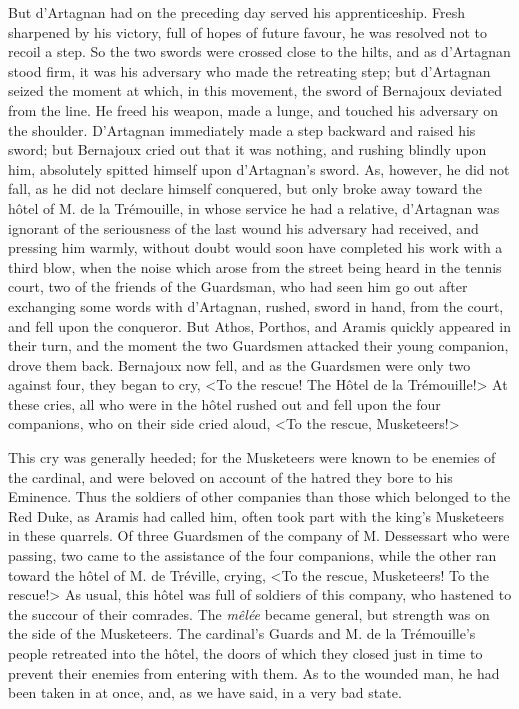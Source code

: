 But d'Artagnan had on the preceding day served his apprenticeship. Fresh sharpened by his victory, full of hopes of future favour, he was resolved not to recoil a step. So the two swords were crossed close to the hilts, and as d'Artagnan stood firm, it was his adversary who made the retreating step; but d'Artagnan seized the moment at which, in this movement, the sword of Bernajoux deviated from the line. He freed his weapon, made a lunge, and touched his adversary on the shoulder. D'Artagnan immediately made a step backward and raised his sword; but Bernajoux cried out that it was nothing, and rushing blindly upon him, absolutely spitted himself upon d'Artagnan's sword. As, however, he did not fall, as he did not declare himself conquered, but only broke away toward the hôtel of M. de la Trémouille, in whose service he had a relative, d'Artagnan was ignorant of the seriousness of the last wound his adversary had received, and pressing him warmly, without doubt would soon have completed his work with a third blow, when the noise which arose from the street being heard in the tennis court, two of the friends of the Guardsman, who had seen him go out after exchanging some words with d'Artagnan, rushed, sword in hand, from the court, and fell upon the conqueror. But Athos, Porthos, and Aramis quickly appeared in their turn, and the moment the two Guardsmen attacked their young companion, drove them back. Bernajoux now fell, and as the Guardsmen were only two against four, they began to cry, <To the rescue! The Hôtel de la Trémouille!> At these cries, all who were in the hôtel rushed out and fell upon the four companions, who on their side cried aloud, <To the rescue, Musketeers!> 

This cry was generally heeded; for the Musketeers were known to be enemies of the cardinal, and were beloved on account of the hatred they bore to his Eminence. Thus the soldiers of other companies than those which belonged to the Red Duke, as Aramis had called him, often took part with the king's Musketeers in these quarrels. Of three Guardsmen of the company of M. Dessessart who were passing, two came to the assistance of the four companions, while the other ran toward the hôtel of M. de Tréville, crying, <To the rescue, Musketeers! To the rescue!> As usual, this hôtel was full of soldiers of this company, who hastened to the succour of their comrades. The \textit{mêlée} became general, but strength was on the side of the Musketeers. The cardinal's Guards and M. de la Trémouille's people retreated into the hôtel, the doors of which they closed just in time to prevent their enemies from entering with them. As to the wounded man, he had been taken in at once, and, as we have said, in a very bad state. 


